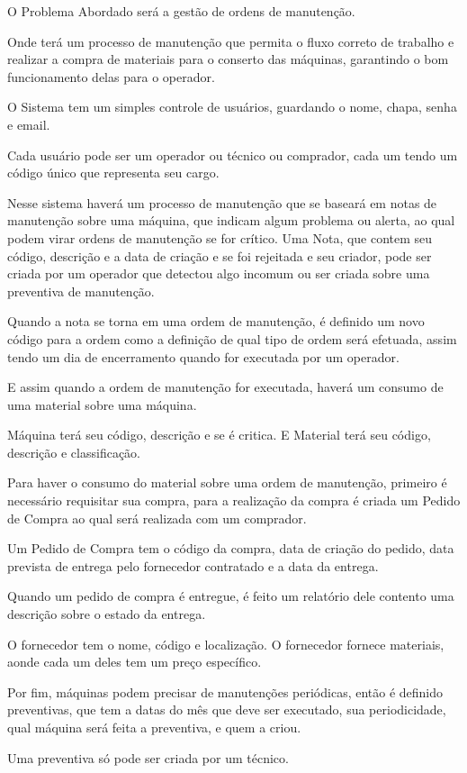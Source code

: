 \begin{FlushLeft}

    \small{

        O Problema Abordado será a gestão de ordens de manutenção.

        Onde terá um processo de manutenção que permita o fluxo correto de trabalho e realizar a compra de materiais para o conserto das máquinas, garantindo o bom funcionamento delas para o operador.

        O Sistema tem um simples controle de usuários, guardando o nome, chapa, senha e email.

        Cada usuário pode ser um operador ou técnico ou comprador, cada um tendo um código único que representa seu cargo.

        Nesse sistema haverá um processo de manutenção que se baseará em notas de manutenção sobre uma máquina, que indicam algum problema ou alerta, ao qual podem virar ordens de manutenção se for crítico.
        Uma Nota, que contem seu código, descrição e a data de criação e se foi rejeitada e seu criador, pode ser criada por um operador que detectou algo incomum ou ser criada sobre uma preventiva de manutenção.

        Quando a nota se torna em uma ordem de manutenção, é definido um novo código para a ordem como a definição de qual tipo de ordem será efetuada, assim tendo um dia de encerramento quando for executada por um operador.

        E assim quando a ordem de manutenção for executada, haverá um consumo de uma material sobre uma máquina.

        Máquina terá seu código, descrição e se é critica. E Material terá seu código, descrição e classificação.

        Para haver o consumo do material sobre uma ordem de manutenção, primeiro é necessário requisitar sua compra, para a realização da compra é criada um Pedido de Compra ao qual será realizada com um comprador.

        Um Pedido de Compra tem o código da compra, data de criação do pedido, data prevista de entrega pelo fornecedor contratado e a data da entrega.

        Quando um pedido de compra é entregue, é feito um relatório dele contento uma descrição sobre o estado da entrega.

        O fornecedor tem o nome, código e localização. O fornecedor fornece materiais, aonde cada um deles tem um preço específico.

        Por fim, máquinas podem precisar de manutenções periódicas, então é definido preventivas, que tem a datas do mês que deve ser executado, sua periodicidade, qual máquina será feita a preventiva, e quem a criou.

        Uma preventiva só pode ser criada por um técnico.
    }
\end{FlushLeft}

